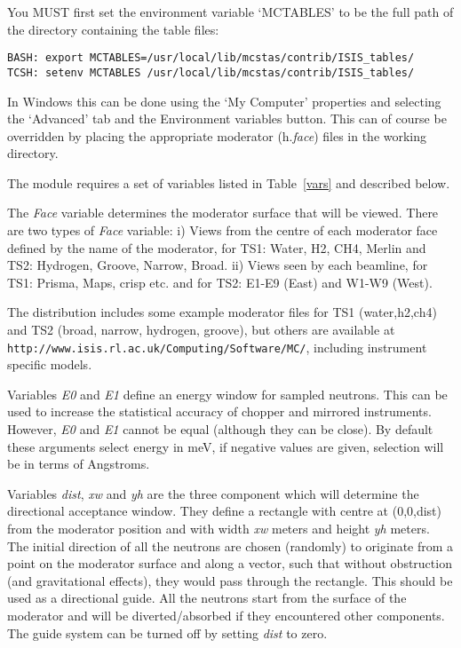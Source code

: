 You MUST first set the environment variable `MCTABLES' to be the
full path of the directory containing the table files:
\begin{lstlisting}
BASH: export MCTABLES=/usr/local/lib/mcstas/contrib/ISIS_tables/
TCSH: setenv MCTABLES /usr/local/lib/mcstas/contrib/ISIS_tables/
\end{lstlisting}
In Windows this can be done using the `My Computer' properties and
selecting the `Advanced' tab and the Environment variables button.
This can of course be overridden by placing the appropriate moderator (h.{\it{face}}) files in the
working directory.

The module requires a set of variables
listed in Table~\ref{vars} and described below.

The {\it Face} variable determines the moderator surface that will
be viewed. There are two types of {\it Face} variable: i)  Views
from the centre of each moderator face defined by the name of the
moderator, for TS1: Water, H2, CH4, Merlin and TS2: Hydrogen,
Groove, Narrow, Broad. ii) Views seen by each beamline, for TS1:
Prisma, Maps, crisp etc. and for TS2: E1-E9 (East) and W1-W9
(West).

The \MCS distribution includes some example moderator files for TS1 (water,h2,ch4) and TS2 (broad, narrow, hydrogen, groove), but others are available at \\ \verb+http://www.isis.rl.ac.uk/Computing/Software/MC/+, including instrument specific models.



Variables {\it E0} and {\it E1} define an energy window for sampled neutrons.
This can be used to increase the statistical
accuracy of chopper and mirrored instruments. However, {\it E0} and
{\it E1} cannot be equal (although they can be close). By default these arguments
select energy in meV, if negative values are given, selection will be in terms of Angstroms.

Variables {\it dist}, {\it xw} and {\it yh} are the three
component which will determine the directional acceptance window.
They define a rectangle with centre at (0,0,dist) from the
moderator position and with width {\it xw} meters and height {\it yh} meters.
The initial direction of all the neutrons are chosen (randomly) to
originate from a point on the moderator surface and along a
vector, such that without obstruction (and gravitational effects),
they would pass through the rectangle. This should be used as a
directional guide. All the neutrons start from the surface of the
moderator and will be diverted/absorbed if they encountered other
components. The guide system can be turned off by setting {\it
dist} to zero.

